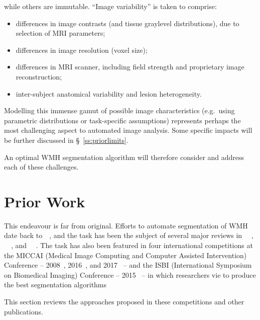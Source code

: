 \begin{enumerate}[itemsep=0pt,topsep=0pt]
    while others are immutable.
    ``Image variability'' is taken to comprise:
    \begin{itemize}[itemsep=0pt,topsep=0pt]
      \item differences in image contrasts (and tissue graylevel distributions),
      due to selection of MRI parameters;
      \item differences in image resolution (voxel size);
      \item differences in MRI scanner, including
      field strength and proprietary image reconstruction;
      \item inter-subject anatomical variability and lesion heterogeneity.
    \end{itemize}
    Modelling this immense gamut of possible image characteristics
    (e.g.\ using parametric distributions or task-specific assumptions)
    represents perhaps the most challenging aspect to automated image analysis.
    Some specific impacts will be further discussed in \S~\ref{ss:priorlimits}.
\end{enumerate}
An optimal WMH segmentation algorithm will therefore consider and address each of these challenges.
\section{Prior Work}\label{s:prior}
This endeavour is far from original.
Efforts to automate segmentation of WMH date back to~\citeyear{Kapouleas1990}~\cite{Kapouleas1990},
and the task has been the subject of several major reviews in%
~\citeyear{Llado2012}~\cite{Llado2012,Mortazavi2012},%
~\citeyear{Garcia-Lorenzo2013}~\cite{Garcia-Lorenzo2013}, and%
~\citeyear{Caligiuri2015}~\cite{Caligiuri2015}.
The task has also been featured in four international competitions at the
MICCAI (Medical Image Computing and Computer Assisted Intervention) Conference -- 
2008~\cite{MSSEG2008}, 2016~\cite{MSSEG2016}, and 2017~\cite{WMHSEG2017} --
and the
ISBI (International Symposium on Biomedical Imaging) Conference -- 
2015~\cite{MSISBI2015} --
in which researchers vie to produce the best segmentation algorithms
\par
This section reviews the approaches proposed in these competitions and other publications.
